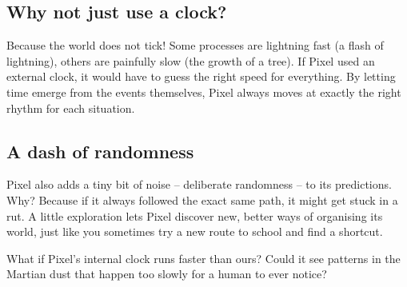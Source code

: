 \subsection*{Why not just use a clock?}

Because the world does not tick!  Some processes are lightning fast
(a flash of lightning), others are painfully slow (the growth of a
tree).  If Pixel used an external clock, it would have to guess the
right speed for everything.  By letting time emerge from the events
themselves, Pixel always moves at exactly the right rhythm for each
situation.

\subsection*{A dash of randomness}

Pixel also adds a tiny bit of noise – deliberate randomness – to its
predictions.  Why?  Because if it always followed the exact same path,
it might get stuck in a rut.  A little exploration lets Pixel discover
new, better ways of organising its world, just like you sometimes try
a new route to school and find a shortcut.

\begin{tcolorbox}[colback=orange!5, colframe=orange!60, title=\textbf{What if...?}]
What if Pixel’s internal clock runs faster than ours?  Could it see
patterns in the Martian dust that happen too slowly for a human to
ever notice?
\end{tcolorbox}